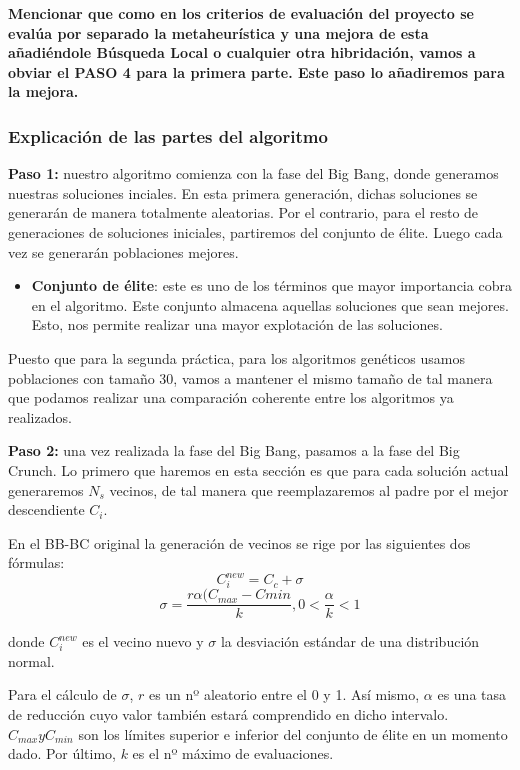 \documentclass[10pt, a4paper]{article}
\theoremstyle{theorem-style}
\theoremstyle{theorem-style}
\theoremstyle{theorem2-style}
\theoremstyle{definition-style}
\theoremstyle{remark-style}
\theoremstyle{example-style}
\theoremstyle{definition-style}
\theoremstyle{remark-style}
\theoremstyle{remark-style}
\begin{document}
\textbf{Mencionar que como en los criterios de evaluación del proyecto se evalúa por separado la metaheurística y una mejora de esta añadiéndole Búsqueda Local o cualquier otra hibridación, vamos a obviar el PASO 4 para la primera parte. Este paso lo añadiremos para la mejora. }

\subsubsection{Explicación de las partes del algoritmo}

\textbf{Paso 1:} nuestro algoritmo comienza con la fase del Big Bang, donde generamos nuestras soluciones inciales. En esta primera generación, dichas soluciones se generarán de manera totalmente aleatorias. Por el contrario, para el resto de generaciones de soluciones iniciales, partiremos del conjunto de élite. Luego cada vez se generarán poblaciones mejores. 

\begin{itemize}
\item \textbf{Conjunto de élite}: este es uno de los términos que mayor importancia cobra en el algoritmo. Este conjunto almacena aquellas soluciones que sean mejores. Esto, nos permite realizar una mayor explotación de las soluciones.  
\end{itemize}

Puesto que para la segunda práctica, para los algoritmos genéticos usamos poblaciones con tamaño 30, vamos a mantener el mismo tamaño de tal manera que podamos realizar una comparación coherente entre los algoritmos ya realizados. 

\textbf{Paso 2: } una vez realizada la fase del Big Bang, pasamos a la fase del Big Crunch. Lo primero que haremos en esta sección es que para cada solución actual generaremos $N_s$ vecinos, de tal manera que reemplazaremos al padre por el mejor descendiente $C_i$. 

En el BB-BC original la generación de vecinos se rige por las siguientes dos fórmulas: 
\begin{equation}
C_i^{new} = C_c + \sigma
\end{equation}
\begin{equation}
\sigma = \frac{r\alpha(C_{max} - C{min}}{k}, 0 < \frac{\alpha}{k} < 1
\end{equation}

donde $C_i^{new}$ es el vecino nuevo y $\sigma$ la desviación estándar de una distribución normal. 

Para el cálculo de $\sigma$, $r$ es un nº aleatorio entre el 0 y 1. Así mismo, $\alpha$ es una tasa de reducción cuyo valor también estará comprendido en dicho intervalo. $C_{max} y C_{min}$ son los límites superior e inferior del conjunto de élite en un momento dado. Por último, $k$ es el nº máximo de evaluaciones. 
\end{document}
